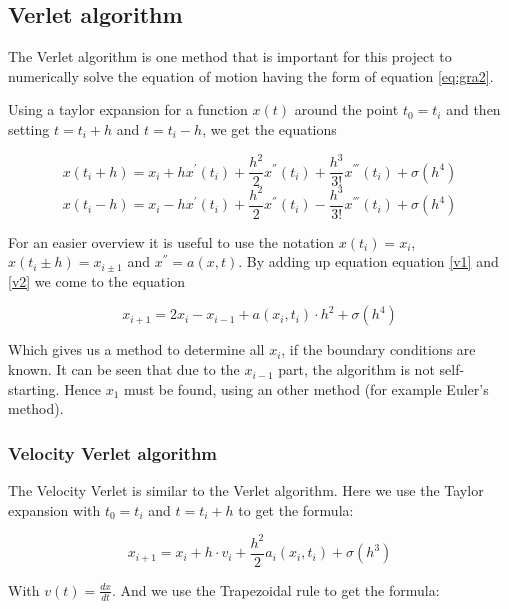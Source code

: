 \documentclass[10pt,a4paper]{article}
\begin{document}
\subsection{Verlet algorithm}

The Verlet algorithm is one method that is important for this project to numerically solve the equation of motion having the form of equation \eqref{eq:gra2}. 

Using a taylor expansion for a function $x(t)$ around the point $t_0 = t_i$ and then setting $t = t_i + h$ and $t = t_i - h$, we get the equations

\begin{equation}
\label{v1}
x(t_i + h) = x_i + h  x^{'}(t_i) + \frac{h^2}{2}  x^{''}(t_i) + \frac{h^3}{3!}  x^{'''}(t_i) + \sigma (h^4)
\end{equation}
\begin{equation}
\label{v2}
x(t_i - h) = x_i - h  x^{'}(t_i) + \frac{h^2}{2}  x^{''}(t_i) - \frac{h^3}{3!}  x^{'''}(t_i) + \sigma (h^4)
\end{equation}

For an easier overview it is useful to use the notation $x(t_i) = x_i$, $x(t_i \pm h) = x_{i \pm 1}$ and $x^{''} = a(x, t)$. By adding up equation equation \eqref{v1} and \eqref{v2} we come to the equation

\begin{equation}
\label{v3}
	x_{i+1} = 2 x_i - x_{i-1} + a(x_i, t_i) \cdot h^2 + \sigma(h^4)
\end{equation}

Which gives us a method to determine all $x_i$, if the boundary conditions are known. It can be seen that due to the $x_{i-1}$ part, the algorithm is not self-starting. Hence $x_1$ must be found, using an other method (for example Euler's method).

\subsubsection{Velocity Verlet algorithm}

The Velocity Verlet is similar to the Verlet algorithm. Here we use the Taylor expansion with $t_0 = t_i$ and $t = t_i + h$ to get the formula: 

\begin{equation}
\label{vv1}
x_{i+1} = x_i + h \cdot v_i + \frac{h^2}{2}  a_i(x_i, t_i) + \sigma (h^3)
\end{equation}

With $v(t) = \frac{dx}{dt}$. And we use the Trapezoidal rule to get the formula:
\end{document}

